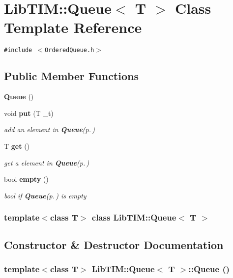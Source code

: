 \section{Lib\-TIM::Queue$<$ T $>$ Class Template Reference}
\label{classLibTIM_1_1Queue}
{\tt \#include $<$Ordered\-Queue.h$>$}

\subsection*{Public Member Functions}
\begin{CompactItemize}
\item 
{\bf Queue} ()
\item 
void {\bf put} (T \_\-t)
\begin{CompactList}\small\item\em add an element in {\bf Queue}{\rm (p.\,\pageref{classLibTIM_1_1Queue})} \item\end{CompactList}\item 
T {\bf get} ()
\begin{CompactList}\small\item\em get a element in {\bf Queue}{\rm (p.\,\pageref{classLibTIM_1_1Queue})} \item\end{CompactList}\item 
bool {\bf empty} ()
\begin{CompactList}\small\item\em bool if {\bf Queue}{\rm (p.\,\pageref{classLibTIM_1_1Queue})} is empty \item\end{CompactList}\end{CompactItemize}
\subsubsection*{template$<$class T$>$ class Lib\-TIM::Queue$<$ T $>$}



\subsection{Constructor \& Destructor Documentation}
\subsubsection{\setlength{\rightskip}{0pt plus 5cm}template$<$class T$>$ {\bf Lib\-TIM::Queue}$<$ T $>$::{\bf Queue} ()\hspace{0.3cm}{\tt  [inline]}}\label{classLibTIM_1_1Queue_a0}




